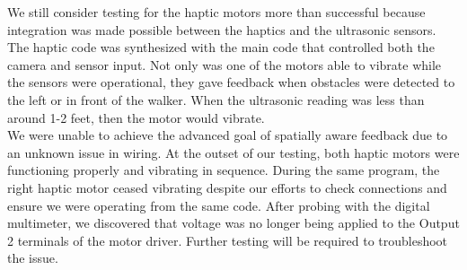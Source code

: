 \noindent We still consider testing for the haptic motors more than successful because integration was made possible between the haptics and the ultrasonic sensors. The haptic code was synthesized with the main code that controlled both the camera and sensor input. Not only was one of the motors able to vibrate while the sensors were operational, they gave feedback when obstacles were detected to the left or in front of the walker. When the ultrasonic reading was less than around 1-2 feet, then the motor would vibrate.\\

\noindent We were unable to achieve the advanced goal of spatially aware feedback due to an unknown issue in wiring. At the outset of our testing, both haptic motors were functioning properly and vibrating in sequence. During the same program, the right haptic motor ceased vibrating despite our efforts to check connections and ensure we were operating from the same code. After probing with the digital multimeter, we discovered that voltage was no longer being applied to the Output 2 terminals of the motor driver. Further testing will be required to troubleshoot the issue.\\